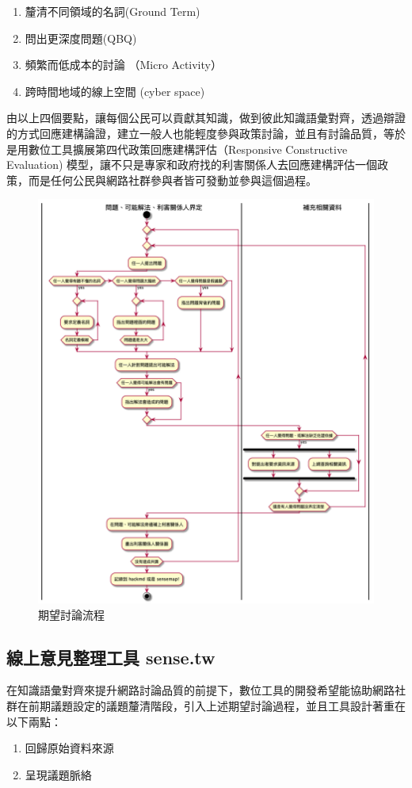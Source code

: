 \documentclass[12pt,a4paper]{article}
\begin{document}
\begin{enumerate}
\item 釐清不同領域的名詞(Ground Term)
\item 問出更深度問題(QBQ)
\item 頻繁而低成本的討論 （Micro Activity）
\item 跨時間地域的線上空間 (cyber space)
\end{enumerate}

由以上四個要點，讓每個公民可以貢獻其知識，做到彼此知識語彙對齊，透過辯證的方式回應建構論證，建立一般人也能輕度參與政策討論，並且有討論品質，等於是用數位工具擴展第四代政策回應建構評估（Responsive Constructive Evaluation) \citep{guba01} 模型，讓不只是專家和政府找的利害關係人去回應建構評估一個政策，而是任何公民與網路社群參與者皆可發動並參與這個過程。

\begin{figure}[htbp]
\centering
\includegraphics[width=.9\linewidth]{./images/problem_idenity_flow.png}
\caption{\label{fig:orgd79e85b}
期望討論流程}
\end{figure}
\subsection{線上意見整理工具 sense.tw }
\label{sec:org09f5393}
在知識語彙對齊來提升網路討論品質的前提下，數位工具的開發希望能協助網路社群在前期議題設定的議題釐清階段，引入上述期望討論過程，並且工具設計著重在以下兩點：
\begin{enumerate}
\item 回歸原始資料來源
\item 呈現議題脈絡
\end{enumerate}
\end{document}
